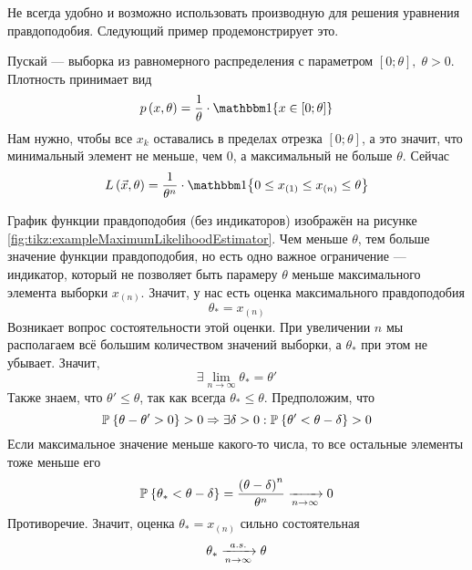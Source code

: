 Не всегда удобно и возможно использовать производную для решения уравнения
правдоподобия.
Следующий пример продемонстрирует это.

\begin{example}
  Пускай \xsample --- выборка из равномерного распределения
  с параметром $\left[ 0; \theta \right],\; \theta > 0$.
  Плотность принимает вид
  \begin{equation*}
    \pdf{x, \theta}
    = \frac{1}{\theta} \cdot \Indicator{x \in \left[ 0; \theta \right]}
  \end{equation*}
  Нам нужно, чтобы все $x_k$ оставались в пределах отрезка
  $\left[ 0; \theta \right]$, а это значит, что минимальный элемент не меньше,
  чем $0$, а максимальный не больше $\theta$. Сейчас
  \begin{equation*}
    L\left( \vec{x}, \theta \right)
    = \frac{1}{\theta^n} \cdot \Indicator{0 \le x_{\left( 1 \right)}
      \le x_{\left( n \right)} \le \theta}
  \end{equation*}

  График функции правдоподобия (без индикаторов) изображён на рисунке
  \ref{fig:tikz:exampleMaximumLikelihoodEstimator}.
  Чем меньше $\theta$, тем больше значение функции правдоподобия, но есть одно
  важное ограничение --- индикатор, который не позволяет быть парамеру $\theta$
  меньше максимального элемента выборки $x_{\left( n \right)}$.
  Значит, у нас есть оценка максимального правдоподобия
  \begin{equation*}
    \theta_* = x_{\left( n \right)}
  \end{equation*}
  Возникает вопрос состоятельности этой оценки.
  При увеличении $n$ мы располагаем всё большим количеством значений выборки,
  а $\theta_*$ при этом не убывает. Значит,
  \begin{equation*}
    \exists \lim_{n \to \infty} \theta_* = \theta'
  \end{equation*}
  Также знаем, что $\theta' \le \theta$, так как всегда $\theta_* \le \theta$.
  Предположим, что
  \begin{equation*}
    \mathbb{P}_{{}}\left\{ \theta - \theta' > 0 \right\} > 0
    \Rightarrow \exists \delta > 0:
      \mathbb{P}_{{}}\left\{ \theta' < \theta - \delta \right\} > 0
  \end{equation*}
  Если максимальное значение меньше какого-то числа, то все остальные элементы
  тоже меньше его
  \begin{equation*}
    \mathbb{P}_{{}}\left\{ \theta_* < \theta - \delta \right\}
    = \frac{\left( \theta - \delta \right)^n}{\theta^n} \xrightarrow[n\to\infty]{} 0
  \end{equation*}
  Противоречие. Значит, оценка $\theta_* = x_{\left( n \right)}$ сильно
  состоятельная
  \begin{equation*}
    \theta_* \xrightarrow[n\to\infty]{a.s.} \theta
  \end{equation*}
\end{example}

